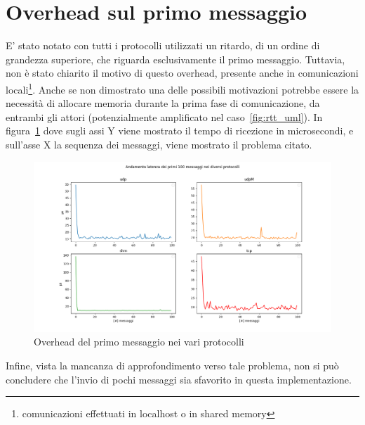 \section{Overhead sul primo messaggio}
E' stato notato con tutti i protocolli utilizzati un ritardo, di un ordine di grandezza superiore, che riguarda esclusivamente il primo messaggio. Tuttavia, non è stato chiarito il motivo di questo overhead, presente anche in comunicazioni locali\footnote{comunicazioni effettuati in localhost o in shared memory}. Anche se non dimostrato una delle possibili motivazioni potrebbe essere la necessità di allocare memoria durante la prima fase di comunicazione, da entrambi gli attori (potenzialmente amplificato nel caso~\ref{fig:rtt_uml}). In figura~\ref{fig:overhead_primo_messaggio} dove sugli assi Y viene mostrato il tempo di ricezione in microsecondi, e sull'asse X la sequenza dei messaggi, viene mostrato il problema citato.
\begin{figure}[H]
    \includegraphics[width=\textwidth]{./results/errortest.png} 
    \caption{Overhead del primo messaggio nei vari protocolli}
    \label{fig:overhead_primo_messaggio}
\end{figure}
Infine, vista la mancanza di approfondimento verso tale problema, non si può concludere che l'invio di pochi messaggi sia sfavorito in questa implementazione.

